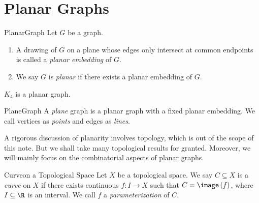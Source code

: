 \documentclass[co342]{subfiles}
\begin{document}

    \section{Planar Graphs}

    \begin{definition}{Planar}{Graph}
        Let $G$ be a graph.
        \begin{enumerate}
            \item A drawing of $G$ on a plane whose edges only intersect at common endpoints is called a \emph{planar embedding} of $G$.
            \item We say $G$ is \emph{planar} if there exists a planar embedding of $G$.
        \end{enumerate}
    \end{definition}

    \ex $K_4$ is a planar graph.
    \begin{eqbox}
        \begin{center}
        \end{center}
    \end{eqbox} 
    
    \begin{definition}{Plane}{Graph}
        A \emph{plane} graph is a planar graph with a fixed planar embedding. We call vertices as \emph{points} and edges as \emph{lines}.
    \end{definition}
    
    \np A rigorous discussion of planarity involves topology, which is out of the scope of this note. But we shall take many topological results for granted. Moreover, we will mainly focus on the combinatorial aspects of planar graphs.

    \begin{recall}{Curve}{on a Topological Space}
        Let $X$ be a topological space. We say $C\subseteq X$ is a \emph{curve} on $X$ if there exists continuous $f:I\to X$ such that $C=\image\left( f \right)$, where $I\subseteq\R$ is an interval. We call $f$ a \emph{parameterization} of $C$.
    \end{recall}
\end{document}
